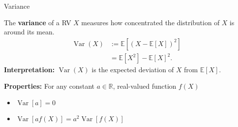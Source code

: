 \documentclass[aspectratio=169,12pt]{beamer}
\DeclareMathOperator{\Var}{Var}
\begin{document}

\begin{frame}[t]{Variance}
  \vspace{0.08cm}
  {\small
  The \textbf{variance} of a RV $X$ measures how concentrated the distribution of
  $X$ is around its mean.
  \[
  \begin{aligned}
    \Var(X)&:=\mathbb{E}[(X-\mathbb{E}[X])^2]\\
           &=\mathbb{E}[X^2]-\mathbb{E}[X]^2.
  \end{aligned}
  \]
  \textbf{Interpretation:} $\Var(X)$ is the expected deviation of $X$ from
  $\mathbb{E}[X]$.

  \textbf{Properties:} For any constant $a\in\mathbb{R}$, real-valued function
  $f(X)$
  \begin{itemize}
    \setlength{\itemsep}{0.10cm}
    \item $\Var[a]=0$
    \item $\Var[af(X)]=a^2\Var[f(X)]$
  \end{itemize}
  }
\end{frame}
\end{document}
